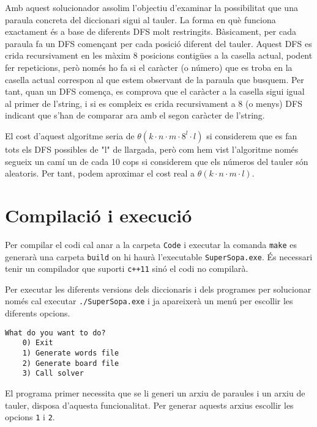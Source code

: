 \documentclass{article}
\begin{document}
Amb aquest solucionador assolim l'objectiu d'examinar la possibilitat que una paraula concreta del diccionari sigui al tauler.
La forma en què funciona exactament és a base de diferents DFS molt restringits. Bàsicament, per cada paraula fa un DFS començant per cada posició diferent del tauler.
Aquest DFS es crida recursivament en les màxim 8 posicions contigües a la casella actual, podent fer repeticions, però només ho fa si el caràcter (o número) que es troba en la casella actual correspon al que estem observant de la paraula que busquem.
Per tant, quan un DFS comença, es comprova que el caràcter a la casella sigui igual al primer de l'string, i si es compleix es crida recursivament a 8 (o menys) DFS indicant que s'han de comparar ara amb el segon caràcter de l'string.

El cost d'aquest algoritme seria de $\theta(k·n·m·8^l·l)$ si considerem que es fan tots els DFS possibles de "l" de llargada, però com hem vist l'algoritme només segueix un camí un de cada 10 cops si considerem que els números del tauler són aleatoris.
Per tant, podem aproximar el cost real a $\theta(k·n·m·l)$.

\section{Compilació i execució}

Per compilar el codi cal anar a la carpeta \verb|Code| i executar la comanda \verb|make| es generarà una carpeta \verb|build| on hi haurà l'executable \verb|SuperSopa.exe|. És necessari tenir un compilador que suporti \verb|c++11| sinó el codi no compilarà.

Per executar les diferents versions dels diccionaris i dels programes per solucionar només cal executar \verb|./SuperSopa.exe| i ja apareixerà un menú per escollir les diferents opcions. 

\begin{lstlisting}[frame=single]
	What do you want to do?
	0) Exit
	1) Generate words file
	2) Generate board file
	3) Call solver
\end{lstlisting}

El programa primer necessita que se li generi un arxiu de paraules i un arxiu de tauler, disposa d'aquesta funcionalitat. Per generar aquests arxius escollir les opcions \verb|1| i \verb|2|.
\end{document}
